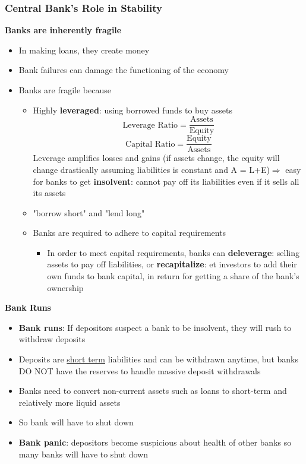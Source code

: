 \documentclass{article}
\begin{document}
\begin{multicols}{2}
\subsubsection{Central Bank's Role in Stability}
\textbf{Banks are inherently fragile}
\begin{itemize}
	\item In making loans, they create money
	\item Bank failures can damage the functioning of the economy
	\item Banks are fragile because
	\begin{itemize}
		\item Highly \textbf{leveraged}: using borrowed funds to buy assets
		$$\text{Leverage Ratio} = \frac{\text{Assets}}{\text{Equity}}$$
		$$\text{Capital Ratio} = \frac{\text{Equity}}{\text{Assets}}$$
		Leverage amplifies losses and gains (if assets change, the equity will change drastically assuming liabilities is constant and A = L+E)$\Rightarrow$ easy for banks to get \textbf{insolvent}: cannot pay off its liabilities even if it sells all its assets
		\item "borrow short" and "lend long"
		\item Banks are required to adhere to capital requirements
		\begin{itemize}
			\item In order to meet capital requirements, banks can \textbf{deleverage}: selling assets to pay off liabilities, or \textbf{recapitalize}: et investors to add their own funds to bank capital, in return for getting a share of the bank’s ownership
		\end{itemize}
	\end{itemize}
\end{itemize}
\textbf{Bank Runs}
\begin{itemize}
	\item \textbf{Bank runs}: If depositors suspect a bank to be insolvent, they will rush to withdraw deposits
	\item Deposits are \underline{short term} liabilities and can be withdrawn anytime, but banks DO NOT have the reserves to handle massive deposit withdrawals
	\item Banks need to convert non-current assets such as loans to short-term and relatively more liquid assets
	\item So bank will have to shut down
	\item \textbf{Bank panic}: depositors become suspicious about health of other banks so many banks will have to shut down

\end{itemize}
\end{multicols}
\end{document}
